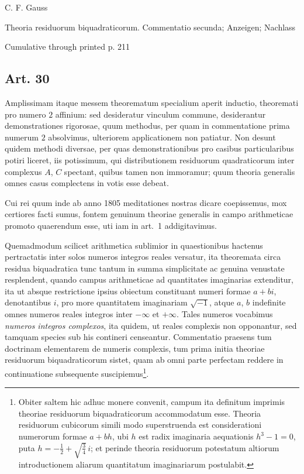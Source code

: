 \documentclass[12pt]{article}
\newcommand{\art}[1]{\subsection*{Art. #1}}
\begin{document}
\begin{center}
{\Large C. F. Gauss}\par
{\large Theoria residuorum biquadraticorum. Commentatio secunda; Anzeigen; Nachlass}\par
{\large Cumulative through printed p. 211}
\end{center}

\art{30}

Amplissimam itaque messem theorematum specialium aperit inductio, theoremati pro numero $2$ affinium: sed desideratur vinculum commune, desiderantur demonstrationes rigorosae, quum methodus, per quam in commentatione prima numerum $2$ absolvimus, ulteriorem applicationem non patiatur. Non desunt quidem methodi diversae, per quas demonstrationibus pro casibus particularibus potiri liceret, iis potissimum, qui distributionem residuorum quadraticorum inter complexus $A$, $C$ spectant, quibus tamen non immoramur; quum theoria generalis omnes casus complectens in votis esse debeat.

Cui rei quum inde ab anno 1805 meditationes nostras dicare coepissemus, mox certiores facti sumus, fontem genuinum theoriae generalis in campo arithmeticae promoto quaerendum esse, uti iam in art.~1 addigitavimus.

Quemadmodum scilicet arithmetica sublimior in quaestionibus hactenus pertractatis inter solos numeros integros reales versatur, ita theoremata circa residua biquadratica tunc tantum in summa simplicitate ac genuina venustate resplendent, quando campus arithmeticae ad quantitates imaginarias extenditur, ita ut absque restrictione ipsius obiectum constituant numeri formae $a+bi$, denotantibus $i$, pro more quantitatem imaginariam $\sqrt{-1}$, atque $a$, $b$ indefinite omnes numeros reales integros inter $-\infty$ et $+\infty$. Tales numeros vocabimus \textit{numeros integros complexos}, ita quidem, ut reales complexis non opponantur, sed tamquam species sub his contineri censeantur. Commentatio praesens tum doctrinam elementarem de numeris complexis, tum prima initia theoriae residuorum biquadraticorum sistet, quam ab omni parte perfectam reddere in continuatione subsequente suscipiemus\footnote{Obiter saltem hic adhuc monere convenit, campum ita definitum imprimis theoriae residuorum biquadraticorum accommodatum esse. Theoria residuorum cubicorum simili modo superstruenda est considerationi numerorum formae $a+bh$, ubi $h$ est radix imaginaria aequationis $h^3-1=0$, puta $h=-\frac{1}{2}+\sqrt{\frac{3}{4}}\,i$; et perinde theoria residuorum potestatum altiorum introductionem aliarum quantitatum imaginariarum postulabit.}.
\end{document}

